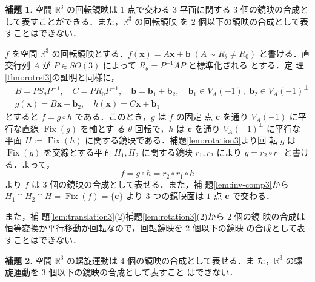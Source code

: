 \documentclass[11pt, uplatex, dvipdfmx, titlepage]{jsarticle}
\makeatletter
\DeclareMathOperator{\Fix}{Fix}
\renewenvironment{proof}[1][\proofname]{\par
  \pushQED{\qed}%
  \normalfont \topsep6\p@\@plus6\p@\relax
  \trivlist
  \item[\hskip\labelsep
         \bfseries
    {#1}]\ignorespaces
}{%
  \popQED\endtrivlist\@endpefalse
}
\theoremstyle{definition}
\newtheorem{lemma}{補題}[section]
\renewcommand{\proofname}{\textbf{証明}}
\makeatother
\begin{document}
\begin{lemma}\label{lem:rotref3}
  空間 $\mathbb{R}^3$ の回転鏡映は $1$ 点で交わる $3$ 平面に関する $3$
  個の鏡映の合成として表すことができる．また，$\mathbb{R}^3$ の回転鏡映
  を $2$ 個以下の鏡映の合成として表すことはできない．
\end{lemma}

\begin{proof}
  $f$ を空間 $\mathbb{R}^3$
  の回転鏡映とする．$f(\bm{x}) = A\bm{x} + \bm{b} \; \left( A \sim
    R_{\theta} \neq R_0 \right)$ と書ける．直交行列 $A$ が $P \in
  SO(3)$ によって $R_{\theta} = P^{-1} A P$ と標準化される とする．定
  理\ref{thm:rotref3}の証明と同様に，
  \begin{align*}
    &B=PS_{\theta}P^{-1}, \quad C=PR_{0}P^{-1}, \quad 
    \bm{b} = \bm{b}_1 + \bm{b}_2, \quad \bm{b}_1 \in V_A(-1), \; \bm{b}_2 \in V_A(-1)^{\perp}\\
    &g(\bm{x})=B\bm{x} + \bm{b}_2, \quad h(\bm{x})=C\bm{x}+\bm{b}_1
  \end{align*}
  とすると $f = g \circ h$ である．このとき，$g$ は $f$ の固定
  点 $\bm{c}$ を通り $V_A(-1)$ に平行な直線 $\Fix(g)$ を軸とす
  る $\theta$ 回転で，$h$ は $\bm{c}$ を通り $V_A(-1)^{\perp}$ に平行な
  平面 $H:=\Fix(h)$ に関する鏡映である．補題\ref{lem:rotation3}より回
  転 $g$ は $\Fix(g)$ を交線とする平面 $H_1, H_2$ に関する鏡映 $r_1,
  r_2$ により $g=r_2 \circ r_1$ と書ける．よって，
  \[
    f = g \circ h = r_2 \circ r_1 \circ h
  \]
  より $f$ は $3$ 個の鏡映の合成として表せる．また，補
  題\ref{lem:inv-comp3}から $H_1 \cap H_2 \cap H = \Fix(f)=\{\bm{c}\}$
  より $3$ つの鏡映面は $1$ 点 $\bm{c}$ で交わる．
  
  また，補
  題\ref{lem:translation3}(2)補題\ref{lem:rotation3}(2)から $2$ 個の鏡
  映の合成は恒等変換か平行移動か回転なので，回転鏡映を $2$ 個以下の鏡映
  の合成として表すことはできない．
\end{proof}

\begin{lemma}\label{lem:spiral3}
  空間 $\mathbb{R}^3$ の螺旋運動は $4$ 個の鏡映の合成として表せる．ま
  た，$\mathbb{R}^3$ の螺旋運動を $3$ 個以下の鏡映の合成として表すこと
  はできない．
\end{lemma}
\end{document}
